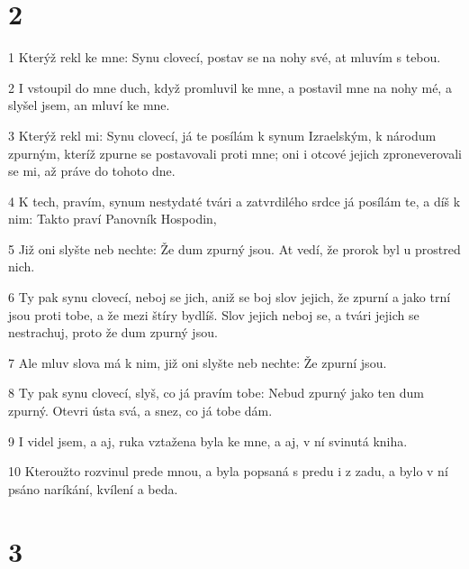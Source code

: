 \chapter{2}

\par 1 Kterýž rekl ke mne: Synu clovecí, postav se na nohy své, at mluvím s tebou.
\par 2 I vstoupil do mne duch, když promluvil ke mne, a postavil mne na nohy mé, a slyšel jsem, an mluví ke mne.
\par 3 Kterýž rekl mi: Synu clovecí, já te posílám k synum Izraelským, k národum zpurným, kteríž zpurne se postavovali proti mne; oni i otcové jejich zproneverovali se mi, až práve do tohoto dne.
\par 4 K tech, pravím, synum nestydaté tvári a zatvrdilého srdce já posílám te, a díš k nim: Takto praví Panovník Hospodin,
\par 5 Již oni slyšte neb nechte: Že dum zpurný jsou. At vedí, že prorok byl u prostred nich.
\par 6 Ty pak synu clovecí, neboj se jich, aniž se boj slov jejich, že zpurní a jako trní jsou proti tobe, a že mezi štíry bydlíš. Slov jejich neboj se, a tvári jejich se nestrachuj, proto že dum zpurný jsou.
\par 7 Ale mluv slova má k nim, již oni slyšte neb nechte: Že zpurní jsou.
\par 8 Ty pak synu clovecí, slyš, co já pravím tobe: Nebud zpurný jako ten dum zpurný. Otevri ústa svá, a snez, co já tobe dám.
\par 9 I videl jsem, a aj, ruka vztažena byla ke mne, a aj, v ní svinutá kniha.
\par 10 Kteroužto rozvinul prede mnou, a byla popsaná s predu i z zadu, a bylo v ní psáno naríkání, kvílení a beda.

\chapter{3}

